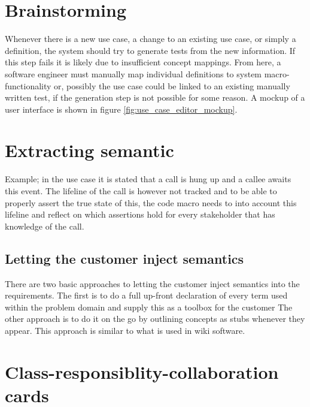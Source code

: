\section{Brainstorming}
Whenever there is a new use case, a change to an existing use case, or simply a definition, the system should try to generate tests from the new information. If this step fails it is likely due to insufficient concept mappings. From here, a software engineer must manually map individual definitions to system macro-functionality or, possibly the use case could be linked to an existing manually written test, if the generation step is not possible for some reason. A mockup of a user interface is shown in figure \ref{fig:use_case_editor_mockup}.


\section{Extracting semantic}
Example; in the use case it is stated that a call is hung up and a callee awaits this event. The lifeline of the call is however not tracked and to be able to properly assert the true state of this, the code macro needs to into account this lifeline and reflect on which assertions hold for every stakeholder that has knowledge of the call. %

\subsection{Letting the customer inject semantics}

There are two basic approaches to letting the customer inject semantics into the requirements. The first is to do a full up-front declaration of every term used within the problem domain and supply this as a toolbox for the customer %
The other approach is to do it on the go by outlining concepts as stubs whenever they appear. This approach is similar to what is used in wiki software. %

\section{Class-responsiblity-collaboration cards}

